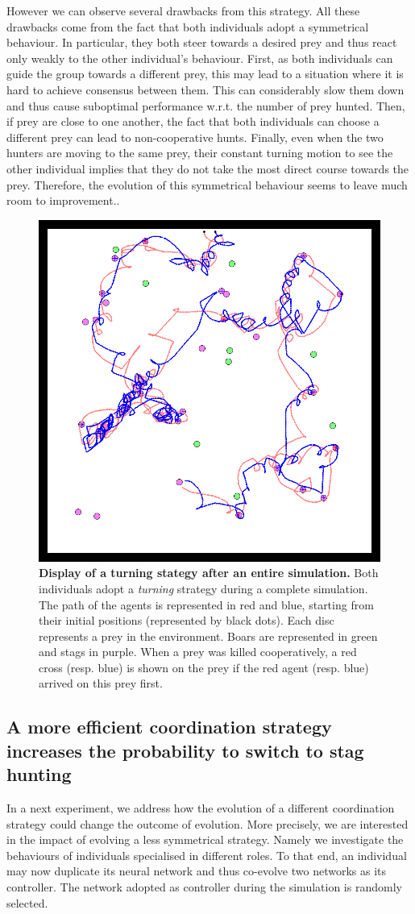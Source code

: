    However we can observe several drawbacks from this strategy. All these drawbacks come from the fact that both individuals adopt a symmetrical behaviour. In particular, they both steer towards a desired prey and thus react only weakly to the other individual's behaviour. First, as both individuals can guide the group towards a different prey, this may lead to a situation where it is hard to achieve consensus between them. This can considerably slow them down and thus cause suboptimal performance w.r.t. the number of prey hunted. Then, if prey are close to one another, the fact that both individuals can choose a different prey can lead to non-cooperative hunts. Finally, even when the two hunters are moving to the same prey, their constant turning motion to see the other individual implies that they do not take the most direct course towards the prey. Therefore, the evolution of this symmetrical behaviour seems to leave much room to improvement..

    \begin{figure}[h]
      \centering
        \includegraphics[width=0.5\linewidth]{fig/ArticleBio2/Fig3.png}
        \caption{\textbf{Display of a turning stategy after an entire simulation.}
        Both individuals adopt a \emph{turning} strategy during a complete simulation. The path of the agents is represented in red and blue, starting from their initial positions (represented by black dots). Each disc represents a prey in the environment. Boars are represented in green and stags in purple. When a prey was killed cooperatively, a red cross (resp. blue) is shown on the prey if the red agent (resp. blue) arrived on this prey first.}
      \label{fig:figTurningBehaviour}
    \end{figure}


  \subsection{A more efficient coordination strategy increases the probability to switch to stag hunting}
    In a next experiment, we address how the evolution of a different coordination strategy could change the outcome of evolution. More precisely, we are interested in the impact of evolving a less symmetrical strategy. Namely we investigate the behaviours of individuals specialised in different roles. To that end, an individual may now duplicate its neural network and thus co-evolve two networks as its controller. The network adopted as controller during the simulation is randomly selected.

